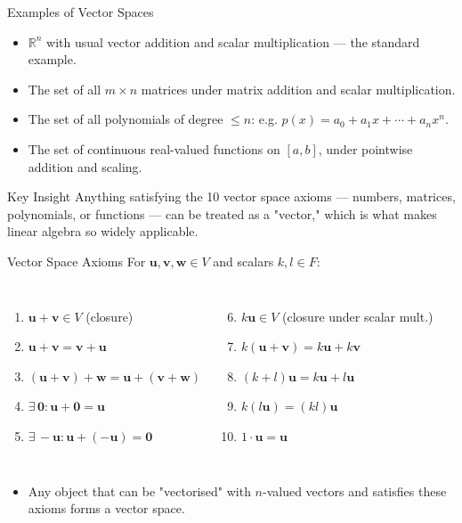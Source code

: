 \documentclass[9pt,aspectratio=169]{beamer}
\newcommand{\R}{\mathbb{R}}
\newcommand{\vect}[1]{\mathbf{#1}}
\begin{document}
\begin{frame}{Examples of Vector Spaces}
\begin{itemize}
\item $\R^n$ with usual vector addition and scalar multiplication — the standard example.
\item The set of all $m\times n$ matrices under matrix addition and scalar multiplication.
\item The set of all polynomials of degree $\le n$: e.g. $p(x) = a_0+a_1x+\cdots+a_nx^n$.
\item The set of continuous real-valued functions on $[a,b]$, under pointwise addition and scaling.
\end{itemize}
\begin{alertblock}{Key Insight}
Anything satisfying the 10 vector space axioms — numbers, matrices, polynomials, or functions — can be treated as a "vector," which is what makes linear algebra so widely applicable.
\end{alertblock}
\end{frame}

\begin{frame}{Vector Space Axioms}
For $\vect{u}, \vect{v}, \vect{w} \in V$ and scalars $k, l \in F$:
\begin{columns}[t]
\footnotesize
\begin{enumerate}
\item $\vect{u}+\vect{v} \in V$ (closure)
\item $\vect{u}+\vect{v} = \vect{v}+\vect{u}$
\item $(\vect{u}+\vect{v})+\vect{w} = \vect{u}+(\vect{v}+\vect{w})$
\item $\exists\, \vect{0}: \vect{u}+\vect{0}=\vect{u}$
\item $\exists\, -\vect{u}: \vect{u}+(-\vect{u}) = \vect{0}$
\end{enumerate}
\footnotesize
\begin{enumerate}
\setcounter{enumi}{5}
\item $k\vect{u} \in V$ (closure under scalar mult.)
\item $k(\vect{u}+\vect{v}) = k\vect{u}+k\vect{v}$
\item $(k+l)\vect{u} = k\vect{u}+l\vect{u}$
\item $k(l\vect{u}) = (kl)\vect{u}$
\item $1\cdot \vect{u} = \vect{u}$
\end{enumerate}
\end{columns}
\vspace{0.3cm}
\begin{itemize}
\item Any object that can be "vectorised" with $n$-valued vectors and satisfies these axioms forms a vector space.
\end{itemize}
\end{frame}
\end{document}
